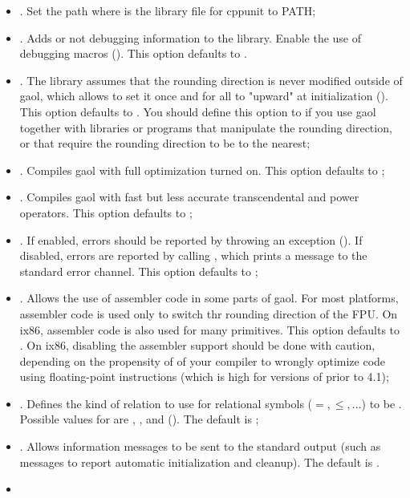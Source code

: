 \documentclass{manual}
\let\leq=\leqslant
\begin{document}
\begin{itemize}
  to PATH;
\item {}. Set the path where is the library file for cppunit to PATH;
\item {}. Adds or not debugging
information to the library. Enable the use of debugging macros ().
This option defaults to .
%
\item {}. The library
  assumes that the rounding direction is never modified outside of
  gaol, which allows to set it once and for all to "upward" at
  initialization ().
  This option defaults to . You should define this option to  if you use
  gaol together with libraries or programs that manipulate the rounding direction, or that
  require the rounding direction to be to the nearest;
%
\item {}. Compiles gaol with full optimization turned on.
  This option defaults to ;
\item {}. Compiles gaol with fast but less accurate
  transcendental and power operators. This option defaults to ;
%
\item {}. If enabled, errors
  should be reported by throwing an exception (). If
  disabled, errors are reported by calling , which
  prints a message to the standard error channel. This option defaults
  to ;
%
\item {}. Allows the use of assembler
  code in some parts of gaol. For most platforms, assembler code is
  used only to switch thr rounding direction of the FPU. On ix86,
  assembler code is also used for many primitives. This option
  defaults to . On ix86, disabling the assembler support
  should be done with caution, depending on the propensity of of your
  compiler to wrongly optimize code using floating-point instructions
  (which is high for versions of  prior to 4.1);
%
\item {}. Defines the kind of relation
  to use for relational symbols ($=,\leq, \dots$) to be
  . Possible values for  are
  , , and  ().
  The default is ;
%
\item {}. Allows information messages to be sent to the standard
  output (such as messages to report automatic initialization and cleanup).
  The default is .
%
%
\item 
\end{itemize}
\end{document}
